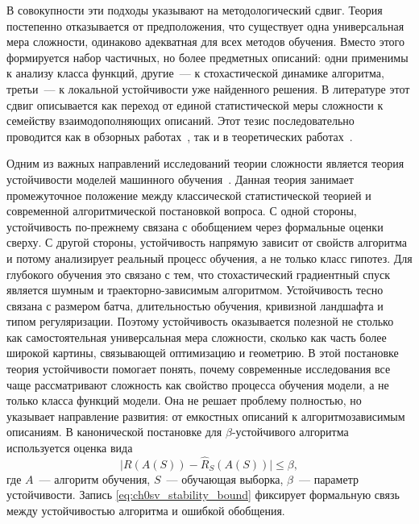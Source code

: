 В совокупности эти подходы указывают на методологический сдвиг.
Теория постепенно отказывается от предположения, что существует одна универсальная мера сложности, одинаково адекватная для всех методов обучения.
Вместо этого формируется набор частичных, но более предметных описаний: одни применимы к анализу класса функций, другие~--- к стохастической динамике алгоритма, третьи~--- к локальной устойчивости уже найденного решения.
В литературе этот сдвиг описывается как переход от единой статистической меры сложности к семейству взаимодополняющих описаний. Этот тезис последовательно проводится как в обзорных работах~\cite{hu2021complexitysurvey,recent2020theory,belkin2021overview}, так и в теоретических работах~\cite{explaining2021thesis,kawaguchi2017generalization,poggio2020theoretical,poggio2017nonoverfitting}.

Одним из важных направлений исследований теории сложности является теория устойчивости моделей машинного обучения~\cite{bousquet2002stability,hardt2016train}.
Данная теория занимает промежуточное положение между классической статистической теорией и современной алгоритмической постановкой вопроса.
С одной стороны, устойчивость по-прежнему связана с обобщением через формальные оценки сверху.
С другой стороны, устойчивость напрямую зависит от свойств алгоритма и потому анализирует реальный процесс обучения, а не только класс гипотез.
Для глубокого обучения это связано с тем, что стохастический градиентный спуск является шумным и траекторно-зависимым алгоритмом.
Устойчивость тесно связана с размером батча, длительностью обучения, кривизной ландшафта и типом регуляризации.
Поэтому устойчивость оказывается полезной не столько как самостоятельная универсальная мера сложности, сколько как часть более широкой картины, связывающей оптимизацию и геометрию.
В этой постановке теория устойчивости помогает понять, почему современные исследования все чаще рассматривают сложность как свойство процесса обучения модели, а не только класса функций модели.
Она не решает проблему полностью, но указывает направление развития: от емкостных описаний к алгоритмозависимым описаниям.
В канонической постановке для $\beta$-устойчивого алгоритма используется оценка вида
\begin{equation}
\bigl|R(A(S))-\hat R_S(A(S))\bigr|\le \beta,
\label{eq:ch0sv_stability_bound}
\end{equation}
где $A$~--- алгоритм обучения, $S$~--- обучающая выборка, $\beta$~--- параметр устойчивости. Запись \eqref{eq:ch0sv_stability_bound} фиксирует формальную связь между устойчивостью алгоритма и ошибкой обобщения.

